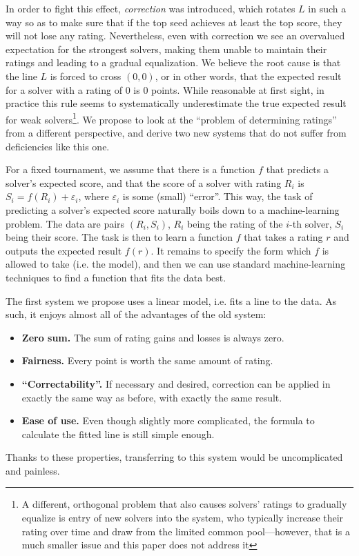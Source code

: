 \documentclass{article}
\begin{document}
In order to fight this effect, \emph{correction} was introduced, which rotates $L$ in such a way so as to make sure that if the top seed achieves at least the top score, they will not lose any rating.
Nevertheless, even with correction we see an overvalued expectation for the strongest solvers, making them unable to maintain their ratings and leading to a gradual equalization. We believe the root cause is that the line $L$ is forced to cross $(0,0)$, or in other words, that the expected result for a solver with a rating of $0$ is $0$ points.
While reasonable at first sight, in practice this rule seems to systematically underestimate the true expected result for weak solvers\footnote{A different, orthogonal problem that also causes solvers' ratings to gradually equalize is entry of new solvers into the system, who typically increase their rating over time and draw from the limited common pool---however, that is a much smaller issue and this paper does not address it}.
We propose to look at the ``problem of determining ratings'' from a different perspective, and derive two new systems that do not suffer from deficiencies like this one.

For a fixed tournament, we assume that there is a function $f$ that predicts a solver's expected score, and that the score of a solver with rating $R_i$ is $S_i=f(R_i)+\varepsilon_i$, where $\varepsilon_i$ is some (small) ``error''.
This way, the task of predicting a solver's expected score naturally boils down to a machine-learning problem.
The data are pairs $(R_i, S_i)$, $R_i$ being the rating of the $i$-th solver, $S_i$ being their score.
The task is then to learn a function $f$ that takes a rating $r$ and outputs the expected result $f(r)$.
It remains to specify the form which $f$ is allowed to take (i.e. the model), and then we can use standard machine-learning techniques to find a function that fits the data best.

The first system we propose uses a linear model, i.e. fits a line to the data.
As such, it enjoys almost all of the advantages of the old system:
\begin{itemize}
\item \textbf{Zero sum.} The sum of rating gains and losses is always zero.
\item \textbf{Fairness.} Every point is worth the same amount of rating.
\item \textbf{``Correctability''.} If necessary and desired, correction can be applied in exactly the same way as before, with exactly the same result.
\item \textbf{Ease of use.} Even though slightly more complicated, the formula to calculate the fitted line is still simple enough.
\end{itemize}
Thanks to these properties, transferring to this system would be uncomplicated and painless.
\end{document}
